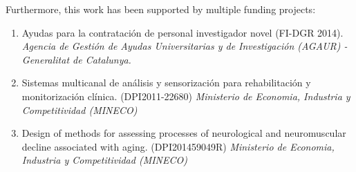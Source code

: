 Furthermore, this work has been supported by multiple funding projects:

\begin{enumerate}
\item Ayudas para la contratación de personal investigador novel (FI-DGR 2014). \emph{Agencia de Gestión de Ayudas Universitarias y de Investigación (AGAUR) - Generalitat de Catalunya.}

\item 	Sistemas multicanal de análisis y sensorización para rehabilitación y monitorización clínica. (DPI2011-22680) \emph{Ministerio de Economia, Industria y Competitividad (MINECO)}

\item 	Design of methods for assessing processes of neurological and neuromuscular decline associated with aging. (DPI201459049R) \emph{Ministerio de Economia, Industria y Competitividad (MINECO)}


\end{enumerate}
